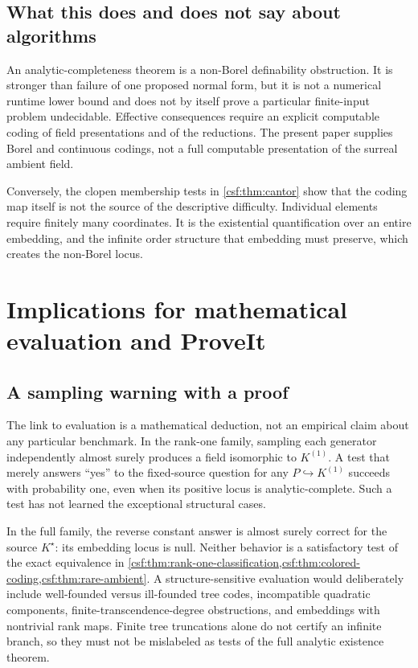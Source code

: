 \documentclass[11pt,a4paper]{article}
\numberwithin{equation}{section}
\theoremstyle{definition}
\theoremstyle{remark}
\newcommand{\emb}{\hookrightarrow}
\newcommand{\Kstar}{K^{\star}}
\newcommand{\Kone}{K^{(1)}}
\begin{document}
\subsection{What this does and does not say about algorithms}

An analytic-completeness theorem is a non-Borel definability obstruction.
It is stronger than failure of one proposed normal form, but it is not a
numerical runtime lower bound and does not by itself prove a particular
finite-input problem undecidable. Effective consequences require an
explicit computable coding of field presentations and of the reductions.
The present paper supplies Borel and continuous codings, not a full
computable presentation of the surreal ambient field.

Conversely, the clopen membership tests in \cref{csf:thm:cantor} show that the
coding map itself is not the source of the descriptive difficulty.
Individual elements require finitely many coordinates. It is the
existential quantification over an entire embedding, and the infinite
order structure that embedding must preserve, which creates the
non-Borel locus.

\section{Implications for mathematical evaluation and ProveIt}
\label{csf:sec:formalization}

\subsection{A sampling warning with a proof}

The link to evaluation is a mathematical deduction, not an empirical
claim about any particular benchmark. In the rank-one family, sampling
each generator independently almost surely produces a field isomorphic
to $\Kone$. A test that merely answers ``yes'' to the fixed-source
question for any $P\emb\Kone$ succeeds with probability one, even when
its positive locus is analytic-complete. Such a test has not learned the
exceptional structural cases.

In the full family, the reverse constant answer is almost surely correct
for the source $\Kstar$: its embedding locus is null. Neither behavior is
a satisfactory test of the exact equivalence in
\cref{csf:thm:rank-one-classification,csf:thm:colored-coding,csf:thm:rare-ambient}.
A structure-sensitive evaluation would deliberately include well-founded
versus ill-founded tree codes, incompatible quadratic components,
finite-transcendence-degree obstructions, and embeddings with nontrivial
rank maps. Finite tree truncations alone do not certify an infinite
branch, so they must not be mislabeled as tests of the full analytic
existence theorem.
\end{document}

